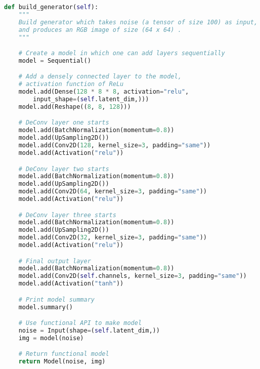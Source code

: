 \begin{lstlisting}[basicstyle=\scriptsize,language=Python]
def build_generator(self):
    """
    Build generator which takes noise (a tensor of size 100) as input,
    and produces an RGB image of size (64 x 64) .
    """

    # Create a model in which one can add layers sequentially
    model = Sequential()

    # Add a densely connected layer to the model, 
    # activation function of ReLu
    model.add(Dense(128 * 8 * 8, activation="relu", 
        input_shape=(self.latent_dim,)))
    model.add(Reshape((8, 8, 128)))

    # DeConv layer one starts
    model.add(BatchNormalization(momentum=0.8))
    model.add(UpSampling2D())
    model.add(Conv2D(128, kernel_size=3, padding="same"))
    model.add(Activation("relu"))

    # DeConv layer two starts
    model.add(BatchNormalization(momentum=0.8))
    model.add(UpSampling2D())
    model.add(Conv2D(64, kernel_size=3, padding="same"))
    model.add(Activation("relu"))

    # DeConv layer three starts
    model.add(BatchNormalization(momentum=0.8))
    model.add(UpSampling2D())
    model.add(Conv2D(32, kernel_size=3, padding="same"))
    model.add(Activation("relu"))

    # Final output layer
    model.add(BatchNormalization(momentum=0.8))
    model.add(Conv2D(self.channels, kernel_size=3, padding="same"))
    model.add(Activation("tanh"))

    # Print model summary
    model.summary()

    # Use functional API to make model
    noise = Input(shape=(self.latent_dim,))
    img = model(noise)

    # Return functional model
    return Model(noise, img)

\end{lstlisting}

